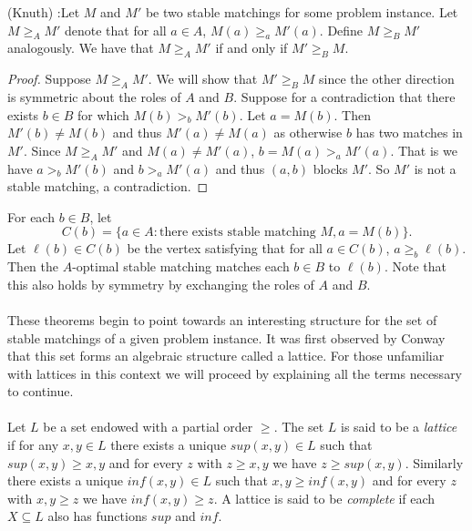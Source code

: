 \begin{theorem} (Knuth) \cite{knuthmariages}:Let $M$ and $M'$ be two stable matchings for some problem instance. Let $M \geq_A M'$ denote that for all $a \in A$, $M(a) \geq_a M'(a)$. Define $M \geq_B M'$ analogously. We have that $M \geq_A M'$ if and only if $M' \geq_B M$.
\end{theorem}
\begin{proof}
Suppose $M \geq_A M'$. We will show that $M' \geq_B M$ since the other direction is symmetric about the roles of $A$ and $B$. Suppose for a contradiction that there exists $b \in B$ for which $M(b) >_b M'(b)$. Let $a = M(b)$. Then $M'(b) \neq M(b)$ and thus $M'(a) \neq M(a)$ as otherwise $b$ has two matches in $M'$. Since $M \geq_A M'$ and $M(a) \neq M'(a)$, $b=M(a) >_a M'(a)$. That is we have $a >_b M'(b)$ and $b >_a M'(a)$ and thus $(a,b)$ blocks $M'$. So $M'$ is not a stable matching, a contradiction. \end{proof}

\begin{corollary}For each $b \in B$, let $$C(b) = \{a \in A: \text{there exists stable matching }M, a = M(b)\}.$$ Let $\ell(b) \in C(b)$  be the vertex satisfying that for all $a \in C(b)$, $a \geq_b \ell(b)$. Then the $A$-optimal stable matching matches each $b \in B$ to $\ell(b)$. Note that this also holds by symmetry by exchanging the roles of $A$ and $B$.
\end{corollary}

\paragraph{}
These theorems begin to point towards an interesting structure for the set of stable matchings of a given problem instance. It was first observed by Conway \cite{knuthmariages} that this set forms an algebraic structure called a lattice. For those unfamiliar with lattices in this context we will proceed by explaining all the terms necessary to continue.

\paragraph{}Let $L$ be a set endowed with a partial order $\geq$. The set $L$ is said to be a {\it lattice} if for any $x, y \in L$ there exists a unique $sup(x,y) \in L$ such that $sup(x,y) \geq x,y$ and for every $z$ with $z \geq x,y$ we have $z \geq sup(x,y)$. Similarly there exists a unique $inf(x,y) \in L$ such that $x,y \geq inf(x,y)$ and for every $z$ with $x,y \geq z$ we have $inf(x,y) \geq z$. A lattice is said to be {\it complete} if each $X \subseteq L$ also has functions $sup$ and $inf$. 

